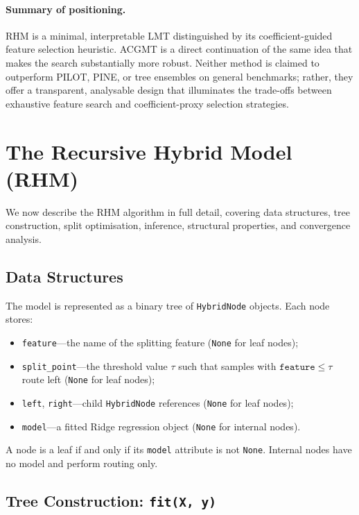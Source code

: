 \documentclass[11pt,a4paper]{article}
\begin{document}
\paragraph{Summary of positioning.} RHM is a minimal, interpretable LMT distinguished by its coefficient-guided feature selection heuristic. ACGMT is a direct continuation of the same idea that makes the search substantially more robust. Neither method is claimed to outperform PILOT, PINE, or tree ensembles on general benchmarks; rather, they offer a transparent, analysable design that illuminates the trade-offs between exhaustive feature search and coefficient-proxy selection strategies.

\section{The Recursive Hybrid Model (RHM)}\label{sec:algorithm}

We now describe the RHM algorithm in full detail, covering data structures, tree construction, split optimisation, inference, structural properties, and convergence analysis.

\subsection{Data Structures}

The model is represented as a binary tree of \texttt{HybridNode} objects. Each node stores:
\begin{itemize}
    \item \texttt{feature}---the name of the splitting feature (\texttt{None} for leaf nodes);
    \item \texttt{split\_point}---the threshold value $\tau$ such that samples with $\texttt{feature} \leq \tau$ route left (\texttt{None} for leaf nodes);
    \item \texttt{left}, \texttt{right}---child \texttt{HybridNode} references (\texttt{None} for leaf nodes);
    \item \texttt{model}---a fitted Ridge regression object (\texttt{None} for internal nodes).
\end{itemize}
A node is a leaf if and only if its \texttt{model} attribute is not \texttt{None}. Internal nodes have no model and perform routing only.

\subsection{Tree Construction: \texttt{fit(X, y)}}
\end{document}
